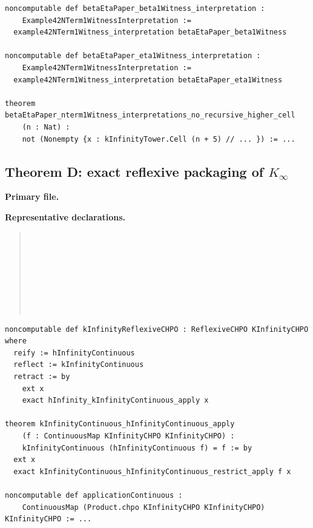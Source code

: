 \documentclass[webpdf,traditional,large,numbered]{oup-authoring-template}
\theoremstyle{thmstyleone}%
\theoremstyle{thmstyletwo}%
\theoremstyle{thmstylethree}%
\newcommand{\Kinf}{K_\infty}
\begin{document}
\begin{lstlisting}[caption={Representative Lean excerpt for Theorem C
  (from \texttt{KInfinity/Examples.lean}).}]
noncomputable def betaEtaPaper_beta1Witness_interpretation :
    Example42NTerm1WitnessInterpretation :=
  example42NTerm1Witness_interpretation betaEtaPaper_beta1Witness

noncomputable def betaEtaPaper_eta1Witness_interpretation :
    Example42NTerm1WitnessInterpretation :=
  example42NTerm1Witness_interpretation betaEtaPaper_eta1Witness

theorem betaEtaPaper_nterm1Witness_interpretations_no_recursive_higher_cell
    (n : Nat) :
    not (Nonempty {x : kInfinityTower.Cell (n + 5) // ... }) := ...
\end{lstlisting}

\subsection*{Theorem D: exact reflexive packaging of $\Kinf$}

\noindent\textbf{Primary file.}
\begin{quote}\raggedright
{}
\end{quote}
\noindent\textbf{Representative declarations.}
\begin{quote}\raggedright
{}\\
\\
\\
\\
\\
\\
\\
\end{quote}

\begin{lstlisting}[caption={Representative Lean excerpt for Theorem D
  (from \texttt{KInfinity/Properties.lean}).}]
noncomputable def kInfinityReflexiveCHPO : ReflexiveCHPO KInfinityCHPO where
  reify := hInfinityContinuous
  reflect := kInfinityContinuous
  retract := by
    ext x
    exact hInfinity_kInfinityContinuous_apply x

theorem kInfinityContinuous_hInfinityContinuous_apply
    (f : ContinuousMap KInfinityCHPO KInfinityCHPO) :
    kInfinityContinuous (hInfinityContinuous f) = f := by
  ext x
  exact kInfinityContinuous_hInfinityContinuous_restrict_apply f x

noncomputable def applicationContinuous :
    ContinuousMap (Product.chpo KInfinityCHPO KInfinityCHPO) KInfinityCHPO := ...
\end{lstlisting}
\end{document}

